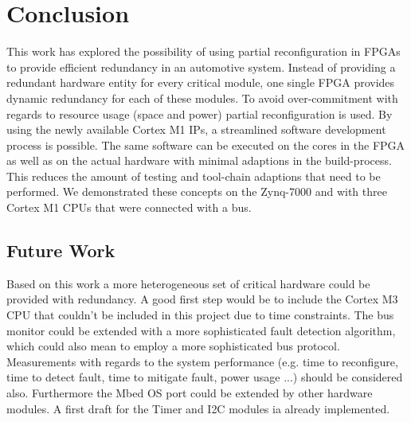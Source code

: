 \chapter{Conclusion}
This work has explored the possibility of using partial reconfiguration in \glspl{FPGA} to provide efficient redundancy in an automotive system.
Instead of providing a redundant hardware entity for every critical module, one single \gls{FPGA} provides dynamic redundancy for each of these modules.
To avoid over-commitment with regards to resource usage (space and power) partial reconfiguration is used.
By using the newly available Cortex M1 IPs, a streamlined software development process is possible. 
The same software can be executed on the cores in the \gls{FPGA} as well as on the actual hardware with minimal adaptions in the build-process.
This reduces the amount of testing and tool-chain adaptions that need to be performed.
We demonstrated these concepts on the Zynq-7000 and with three Cortex M1 \glspl{CPU} that were connected with a bus.

\section{Future Work}
Based on this work a more heterogeneous set of critical hardware could be provided with redundancy. 
A good first step would be to include the Cortex M3 CPU that couldn't be included in this project due to time constraints.
The bus monitor could be extended with a more sophisticated fault detection algorithm, which could also mean to employ a more sophisticated bus protocol.
Measurements with regards to the system performance (e.g. time to reconfigure, time to detect fault, time to mitigate fault, power usage ...) should be considered also.
Furthermore the Mbed OS port could be extended by other hardware modules. A first draft for the Timer and I2C modules ia already implemented.